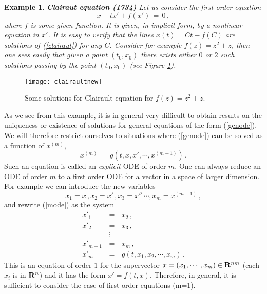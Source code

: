 \documentclass[12pt]{report}
\newcommand{\bR}{{\bf R}}
\newtheorem{example}[theorem]{Example}
\newcommand{\nn}{\nonumber}
\def\eqref#1{(\ref{#1})}
\begin{document}
\begin{example}{\rm {\bf Clairaut equation (1734)}  Let us consider the first 
order equation
\begin{equation}\label{clairaut}
x - t x' + f(x')\,=\,0 \,,
\end{equation}
where $f$ is some given function. It is given, in implicit form, by a
nonlinear equation in $x'$. It is easy to verify that the lines $x(t)
= Ct -f(C)$ are solutions of \eqref{clairaut} for any $C$.  Consider
for example $f(z) = z^2 +z$, then one sees easily that given a point
$(t_0, x_0)$ there exists either $0$ or $2$ such solutions passing by
the point $(t_0, x_0)$ (see Figure \ref{figclairault}). }
\end{example}

\begin{figure}[htbp]
\begin{center}
\texttt{[image: clairaultnew]}
\caption{Some solutions for Clairault equation for $f(z)=z^2 +z$.}
\label{figclairault}
\end{center}
\end{figure}

As we see from this example, it is in general very difficult to obtain
results on the uniqueness or existence of solutions for general
equations of the form \eqref{genode}. We will therefore 
restrict ourselves to situations where \eqref{genode} can be solved as a function of
$x^{(m)}$,
\begin{equation}\label{mode}
x^{(m)} \,=\, g(t, x, x', \cdots, x^{(m-1)}) \,.
\end{equation}
Such an equation is called an {\em explicit} ODE of order $m$. One can always reduce 
an ODE of order $m$ to a first order ODE for a vector in a space of larger dimension. 
For example we can introduce the new variables 
\begin{equation}
x_1 = x\,, x_2 = x' \,, x_3 = x''\, \cdots, x_m =x^{(m-1)} \,,
\end{equation}
and rewrite \eqref{mode} as the system 
\begin{eqnarray}
x'_1\,&=&\, x_2 \,, \nn \\
x'_2\,&=&\, x_3 \,, \nn \\
   \,&\vdots&\,  \\
x'_{m-1}\,&=&\, x_m \,, \nn \\
x'_{m}\,&=&\, g(t, x_1, x_2, \cdots, x_m) \,. \nn 
\end{eqnarray}
This is an equation of order $1$ for the supervector $x = (x_1,
\cdots, x_m) \in \bR^{nm}$ (each $x_i$ is in $\bR^n$) and it has the
form $x' = f(t,x)$.  Therefore, in general, it is sufficient to
consider the case of first order equations (m=1).
\end{document}
